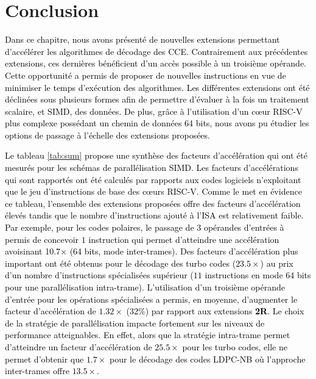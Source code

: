 \documentclass[../main.tex]{subfiles}
\begin{document}
%
%
%
%
\section{Conclusion}
%
%
%
%
\textcolor{black}{Dans ce chapitre, nous avons présenté de nouvelles extensions permettant d'accélérer les algorithmes de décodage des CCE. 
Contrairement aux précédentes extensions, ces dernières bénéficient d'un accès possible à un troisième opérande. 
Cette opportunité a permis de proposer de nouvelles instructions en vue de minimiser le temps d'exécution des algorithmes. 
Les différentes extensions ont été déclinées sous plusieurs formes afin de permettre d'évaluer à la fois un traitement scalaire, et SIMD, des données. 
De plus, grâce à l'utilisation d'un cœur RISC-V plus complexe possédant un chemin de données 64 bits, nous avons pu étudier les options de passage à l'échelle des extensions proposées.}

\textcolor{black}{Le tableau \ref{tab:sum} propose une synthèse des facteurs d'accélération qui ont été mesurés pour les schémas de parallélisation SIMD. 
Les facteurs d'accélérations qui sont rapportés ont été calculés par rapports aux codes logiciels n'exploitant que le jeu d'instructions de base des cœurs RISC-V. 
Comme le met en évidence ce tableau, l'ensemble des extensions proposées offre des facteurs d'accélération élevés tandis que le nombre d'instructions ajouté à l'ISA est relativement faible. 
Par exemple, pour les codes polaires, le passage de $3$ opérandes d'entrées à permis de concevoir $1$ instruction qui permet d'atteindre une accélération avoisinant 10.7$\times$ (64 bits, mode inter-trames). 
Des facteurs d'accélération plus important ont été obtenus pour le décodage des turbo codes ($23.5\times$) au prix d'un nombre d'instructions spécialisées supérieur ($11$ instructions en mode 64 bits pour une parallélisation intra-trame). 
L'utilisation d'un troisième opérande d'entrée pour les opérations spécialisées a permis, en moyenne, d'augmenter le facteur d'accélération de $1.32\times$ (32\%) par rapport aux extensions \textbf{2R}.
Le choix de la stratégie de parallélisation impacte fortement sur les niveaux de performance atteignables. 
En effet, alors que la stratégie intra-trame permet d'atteindre un facteur d'accélération de $25.5\times$ pour les turbo codes, elle ne permet d'obtenir que $1.7\times$ pour le décodage des codes LDPC-NB où l'approche inter-trames offre $13.5\times$.}
\end{document}

